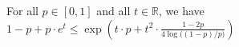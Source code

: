 For all $p \in [0,1]$ and all $t \in \mathbb{R}$, we have $1 - p + p \cdot e^{t} \leq \exp\!\left(t \cdot p + t^{2}\cdot \frac{1 - 2p}{4 \log\!\bigl((1-p)/p\bigr)}\right)$